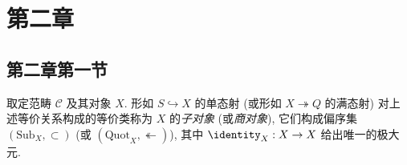 \chapter{第二章}
\section{第二章第一节}
\begin{definition}\label{def:sub-quot-obj}
	 
	 
	取定范畴 $\mathcal{C}$ 及其对象 $X$. 形如 $S \hookrightarrow X$ 的单态射 (或形如 $X \twoheadrightarrow Q$ 的满态射) 对上述等价关系构成的等价类称为 $X$ 的\emph{子对象} (或\emph{商对象}), 它们构成偏序集 $(\mathrm{Sub}_X, \subset)$ (或 $(\mathrm{Quot}_X, \twoheadleftarrow)$), 其中 $\identity_X: X \to X$ 给出唯一的极大元.
\end{definition}


